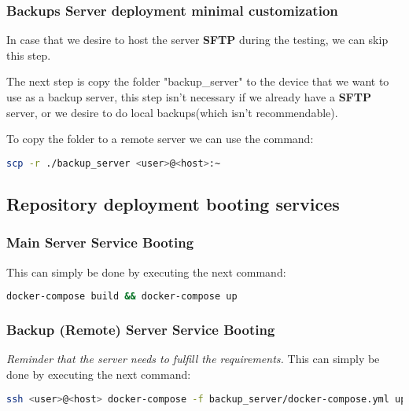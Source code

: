 \newpage
\subsubsection[Backups Server deployment minimal customization]{Backups Server deployment minimal customization}
\begin{flushleft}
    In case that we desire to host the server \textbf{SFTP} during the testing, we can skip this step.
\end{flushleft}

\begin{flushleft}
    The next step is copy the folder "backup\_server" to the device that we want to use as a backup server, this step
    isn't necessary if we already have a \textbf{SFTP} server, or we desire to do local backups(which isn't recommendable).

    To copy the folder to a remote server we can use the command:
\begin{lstlisting}[language=bash,label={lst:scp}]
scp -r ./backup_server <user>@<host>:~\end{lstlisting}
\end{flushleft}

\subsection{Repository deployment booting services}\label{subsec:repository-deployment-booting-services}
\subsubsection[Main Server Service Booting]{Main Server Service Booting}
This can simply be done by executing the next command:
\begin{lstlisting}[language=bash,label={lst:compose-up}]
docker-compose build && docker-compose up\end{lstlisting}

\subsubsection[Backup (Remote) Server Service Booting]{Backup (Remote) Server Service Booting}
\textit{Reminder that the server needs to fulfill the requirements.}
This can simply be done by executing the next command:
\begin{lstlisting}[language=bash,label={lst:compose-up-bk-remote}]
ssh <user>@<host> docker-compose -f backup_server/docker-compose.yml up -d\end{lstlisting}

